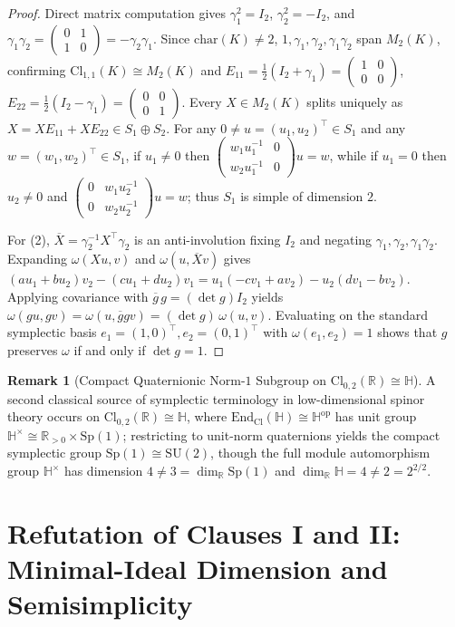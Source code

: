\documentclass[11pt,a4paper]{article}
\newcommand{\smat}[4]{\left(\begin{smallmatrix}#1&#2\\#3&#4\end{smallmatrix}\right)}
\theoremstyle{definition}
\newtheorem{remark}[theorem]{Remark}
\newcommand{\Cl}{\mathrm{Cl}}
\newcommand{\End}{\mathrm{End}}
\newcommand{\Sp}{\mathrm{Sp}}
\begin{document}
\begin{proof}
Direct matrix computation gives $\gamma_1^2 = I_2$, $\gamma_2^2 = -I_2$, and $\gamma_1\gamma_2 = \smat{0}{1}{1}{0} = -\gamma_2\gamma_1$. Since $\mathrm{char}(K) \neq 2$, $1, \gamma_1, \gamma_2, \gamma_1\gamma_2$ span $M_2(K)$, confirming $\Cl_{1,1}(K) \cong M_2(K)$ and $E_{11} = \frac{1}{2}(I_2 + \gamma_1) = \smat{1}{0}{0}{0}$, $E_{22} = \frac{1}{2}(I_2 - \gamma_1) = \smat{0}{0}{0}{1}$. Every $X \in M_2(K)$ splits uniquely as $X = X E_{11} + X E_{22} \in S_1 \oplus S_2$. For any $0 \neq u = (u_1, u_2)^\top \in S_1$ and any $w = (w_1, w_2)^\top \in S_1$, if $u_1 \neq 0$ then $\smat{w_1 u_1^{-1}}{0}{w_2 u_1^{-1}}{0} u = w$, while if $u_1 = 0$ then $u_2 \neq 0$ and $\smat{0}{w_1 u_2^{-1}}{0}{w_2 u_2^{-1}} u = w$; thus $S_1$ is simple of dimension $2$.

For (2), $\overline{X} = \gamma_2^{-1} X^\top \gamma_2$ is an anti-involution fixing $I_2$ and negating $\gamma_1, \gamma_2, \gamma_1\gamma_2$. Expanding $\omega(Xu, v)$ and $\omega(u, \overline{X}v)$ gives $(a u_1 + b u_2)v_2 - (c u_1 + d u_2)v_1 = u_1(-c v_1 + a v_2) - u_2(d v_1 - b v_2)$. Applying covariance with $\overline{g}\,g = (\det g)I_2$ yields $\omega(gu, gv) = \omega(u, \overline{g}gv) = (\det g)\,\omega(u, v)$. Evaluating on the standard symplectic basis $e_1 = (1,0)^\top, e_2 = (0,1)^\top$ with $\omega(e_1, e_2) = 1$ shows that $g$ preserves $\omega$ if and only if $\det g = 1$.
\end{proof}

\begin{remark}[Compact Quaternionic Norm-$1$ Subgroup on $\Cl_{0,2}(\mathbb{R}) \cong \mathbb{H}$]
A second classical source of symplectic terminology in low-dimensional spinor theory occurs on $\Cl_{0,2}(\mathbb{R}) \cong \mathbb{H}$, where $\End_{\Cl}(\mathbb{H}) \cong \mathbb{H}^{\mathrm{op}}$ has unit group $\mathbb{H}^\times \cong \mathbb{R}_{>0} \times \Sp(1)$; restricting to unit-norm quaternions yields the compact symplectic group $\Sp(1) \cong \mathrm{SU}(2)$, though the full module automorphism group $\mathbb{H}^\times$ has dimension $4 \neq 3 = \dim_{\mathbb{R}} \Sp(1)$ and $\dim_{\mathbb{R}} \mathbb{H} = 4 \neq 2 = 2^{2/2}$.
\end{remark}

\section{Refutation of Clauses I and II: Minimal-Ideal Dimension and Semisimplicity}\label{sec:clauses12}
\end{document}
